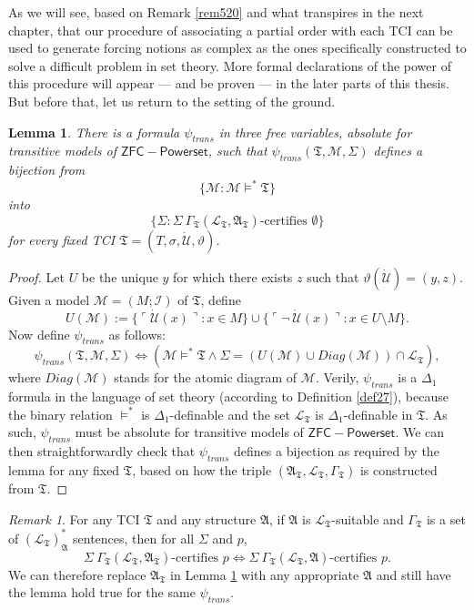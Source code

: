 \documentclass[12pt, twoside]{memoir}
\numberwithin{equation}{section}
\newtheorem{lem}[thm]{Lemma}
\theoremstyle{definition}
\theoremstyle{remark}
\newtheorem{rem}[thm]{Remark}
\theoremstyle{definition}
\theoremstyle{definition}
\theoremstyle{definition}
\theoremstyle{remark}
\begin{document}
As we will see, based on Remark \ref{rem520} and what transpires in the next chapter, that our procedure of associating a partial order with each TCI can be used to generate forcing notions as complex as the ones specifically constructed to solve a difficult problem in set theory. More formal declarations of the power of this procedure will appear --- and be proven --- in the later parts of this thesis. But before that, let us return to the setting of the ground.

\begin{lem}\label{mcequiv2}
There is a formula $\psi_{trans}$ in three free variables, absolute for transitive models of $\mathsf{ZFC - Powerset}$, such that $\psi_{trans}(\mathfrak{T}, \mathcal{M}, \Sigma)$ defines a bijection from $$\{\mathcal{M} : \mathcal{M} \models^* \mathfrak{T}\}$$ into $$\{\Sigma : \Sigma \ \Gamma_{\mathfrak{T}} (\mathcal{L}_{\mathfrak{T}}, \mathfrak{A}_{\mathfrak{T}})\text{-certifies } \emptyset\}$$ for every fixed TCI $\mathfrak{T} = (T, \sigma, \dot{\mathcal{U}}, \vartheta)$.
\end{lem}

\begin{proof}
Let $U$ be the unique $y$ for which there exists $z$ such that $\vartheta(\dot{\mathcal{U}}) = (y, z)$. Given a model $\mathcal{M} = (M; \mathcal{I})$ of $\mathfrak{T}$, define $$U(\mathcal{M}) := \{\ulcorner \dot{\mathcal{U}}(x) \urcorner : x \in M\} \cup \{\ulcorner \neg \ \dot{\mathcal{U}}(x) \urcorner : x \in U \setminus M\}.$$ Now define $\psi_{trans}$ as follows: $$\psi_{trans}(\mathfrak{T}, \mathcal{M}, \Sigma) \iff (\mathcal{M} \models^* \mathfrak{T} \wedge \Sigma = (U(\mathcal{M}) \cup Diag(\mathcal{M})) \cap \mathcal{L}_{\mathfrak{T}}),$$ where $Diag(\mathcal{M})$ stands for the atomic diagram of $\mathcal{M}$. Verily, $\psi_{trans}$ is a $\Delta_1$ formula in the language of set theory (according to Definition \ref{def27}), because the binary relation $\models^*$ is $\Delta_1$-definable and the set $\mathcal{L}_{\mathfrak{T}}$ is $\Delta_1$-definable in $\mathfrak{T}$. As such, $\psi_{trans}$ must be absolute for transitive models of $\mathsf{ZFC - Powerset}$. We can then straightforwardly check that $\psi_{trans}$ defines a bijection as required by the lemma for any fixed $\mathfrak{T}$, based on how the triple $(\mathfrak{A}_{\mathfrak{T}}, \mathcal{L}_{\mathfrak{T}}, \Gamma_{\mathfrak{T}})$ is constructed from $\mathfrak{T}$. 
\end{proof}

\begin{rem}\label{swapA}
For any TCI $\mathfrak{T}$ and any structure $\mathfrak{A}$, if $\mathfrak{A}$ is $\mathcal{L}_{\mathfrak{T}}$-suitable and $\Gamma_{\mathfrak{T}}$ is a set of $(\mathcal{L}_{\mathfrak{T}})^*_{\mathfrak{A}}$ sentences, then for all $\Sigma$ and $p$, $$\Sigma \ \Gamma_{\mathfrak{T}} (\mathcal{L}_{\mathfrak{T}}, \mathfrak{A}_{\mathfrak{T}})\text{-certifies } p \iff \Sigma \ \Gamma_{\mathfrak{T}} (\mathcal{L}_{\mathfrak{T}}, \mathfrak{A})\text{-certifies } p.$$ We can therefore replace $\mathfrak{A}_{\mathfrak{T}}$ in Lemma \ref{mcequiv2} with any appropriate $\mathfrak{A}$ and still have the lemma hold true for the same $\psi_{trans}$.
\end{rem}
\end{document}
